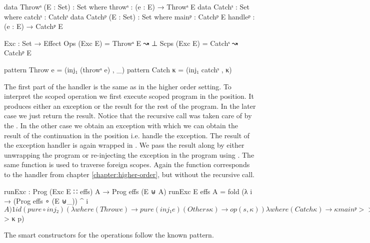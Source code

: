 \begin{code}
data Throwˢ (E : Set)  : Set where throwˢ : (e : E) → Throwˢ E
data Catchˢ            : Set where catchˢ : Catchˢ
data Catchᵖ (E : Set)  : Set where
  mainᵖ    : Catchᵖ E
  handleᵖ  : (e : E) → Catchᵖ E

Exc : Set → Effect
Ops   (Exc E) = Throwˢ E  ↝ ⊥
Scps  (Exc E) = Catchˢ    ↝ Catchᵖ E

pattern Throw  e = (inj₁ (throwˢ e) , _)
pattern Catch  κ = (inj₁ catchˢ , κ)
\end{code}
The first part of the handler is the same as in the higher order setting.
To interpret the scoped operation  we first execute scoped
program in the  position.
It produces either an exception or the result for the rest of the program.
In the later case we just return the result.
Notice that the recursive call was taken care of by the .
In the other case we obtain an exception  with which we can
obtain the result of the continuation in the 
position i.e. handle the exception.
The result of the exception handler is again wrapped in .
We pass the result along by either unwrapping the program or re-injecting the
exception in the program using .
The same function is used to traverse foreign scopes.
Again the function corresponds to the handler from chapter
\ref{chapter:higher-order}, but without the recursive call.

\begin{code}
runExc : Prog (Exc E ∷ effs) A → Prog effs (E ⊎ A)
runExc {E} {effs} {A} = fold (λ i → (Prog effs ∘ (E ⊎_)) ^ i $ A) 1 id
  (pure ∘ inj₂)
  ( λ where
    (Throw e)    → pure (inj₁ e)
    (Other s κ)  → op (s , κ)
  ) λ where
    (Catch κ) → κ mainᵖ >>= λ where
      (inj₁ e)  → κ (handleᵖ e) >>= [ pure ∘ inj₁ , id ]
      (inj₂ x)  → x
    (Other s κ) → scp (s , λ p → [ pure ∘ inj₁ , id ] <$> κ p)
\end{code}
The smart constructors for the operations follow the known pattern.



